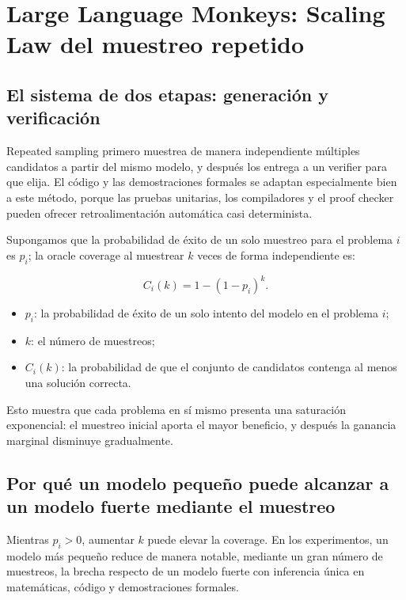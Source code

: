 \section{Large Language Monkeys: Scaling Law del muestreo repetido}

\subsection{El sistema de dos etapas: generación y verificación}

Repeated sampling primero muestrea de manera independiente múltiples candidatos a partir del mismo modelo, y después los entrega a un verifier para que elija. El código y las demostraciones formales se adaptan especialmente bien a este método, porque las pruebas unitarias, los compiladores y el proof checker pueden ofrecer retroalimentación automática casi determinista.


Supongamos que la probabilidad de éxito de un solo muestreo para el problema $i$ es $p_i$; la oracle coverage al muestrear $k$ veces de forma independiente es:

$$
C_i(k)=1-(1-p_i)^k.
$$

\begin{itemize}
    \item $p_i$: la probabilidad de éxito de un solo intento del modelo en el problema $i$;
    \item $k$: el número de muestreos;
    \item $C_i(k)$: la probabilidad de que el conjunto de candidatos contenga al menos una solución correcta.
\end{itemize}

Esto muestra que cada problema en sí mismo presenta una saturación exponencial: el muestreo inicial aporta el mayor beneficio, y después la ganancia marginal disminuye gradualmente.

\subsection{Por qué un modelo pequeño puede alcanzar a un modelo fuerte mediante el muestreo}

Mientras $p_i>0$, aumentar $k$ puede elevar la coverage. En los experimentos, un modelo más pequeño reduce de manera notable, mediante un gran número de muestreos, la brecha respecto de un modelo fuerte con inferencia única en matemáticas, código y demostraciones formales.

